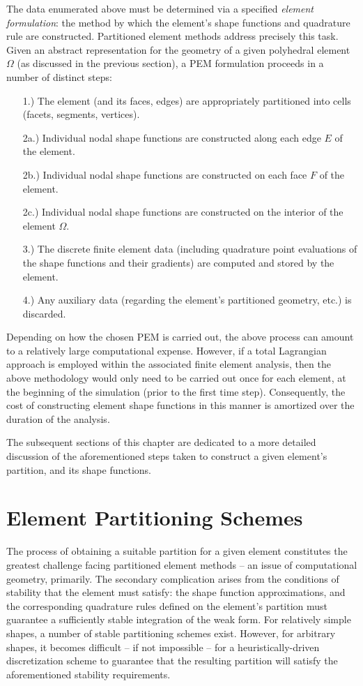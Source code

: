 	The data enumerated above must be determined via a specified \textit{element formulation}: the method by which the element's shape functions and quadrature rule are constructed. Partitioned element methods address precisely this task. Given an abstract representation for the geometry of a given polyhedral element $\Omega$ (as discussed in the previous section), a PEM formulation proceeds in a number of distinct steps:
	\begin{itemize}
		\item[1.)] The element (and its faces, edges) are appropriately partitioned into cells (facets, segments, vertices).
		\item[2a.)] Individual nodal shape functions are constructed along each edge $E$ of the element.
		\item[2b.)] Individual nodal shape functions are constructed on each face $F$ of the element.
		\item[2c.)] Individual nodal shape functions are constructed on the interior of the element $\Omega$.
		\item[3.)] The discrete finite element data (including quadrature point evaluations of the shape functions and their gradients) are computed and stored by the element.
		\item[4.)] Any auxiliary data (regarding the element's partitioned geometry, etc.) is discarded.
	\end{itemize}
	
	Depending on how the chosen PEM is carried out, the above process can amount to a relatively large computational expense. However, if a total Lagrangian approach is employed within the associated finite element analysis, then the above methodology would only need to be carried out once for each element, at the beginning of the simulation (prior to the first time step). Consequently, the cost of constructing element shape functions in this manner is amortized over the duration of the analysis.
	
	The subsequent sections of this chapter are dedicated to a more detailed discussion of the aforementioned steps taken to construct a given element's partition, and its shape functions.
	
\section{Element Partitioning Schemes}

	The process of obtaining a suitable partition for a given element constitutes the greatest challenge facing partitioned element methods -- an issue of computational geometry, primarily. The secondary complication arises from the conditions of stability that the element must satisfy: the shape function approximations, and the corresponding quadrature rules defined on the element's partition must guarantee a sufficiently stable integration of the weak form. For relatively simple shapes, a number of stable partitioning schemes exist. However, for arbitrary shapes, it becomes difficult -- if not impossible -- for a heuristically-driven discretization scheme to guarantee that the resulting partition will satisfy the aforementioned stability requirements.

